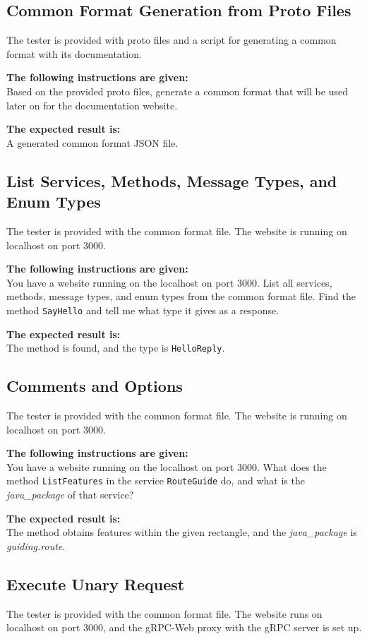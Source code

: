 \subsection{Common Format Generation from Proto Files}
The tester is provided with proto files and a script for generating a common format with its documentation.

\textbf{The following instructions are given:}\\
Based on the provided proto files, generate a common format that will be used later on for the documentation website.

\textbf{The expected result is:}\\
A generated common format JSON file.

\subsection{List Services, Methods, Message Types, and Enum Types}
The tester is provided with the common format file.
The website is running on localhost on port 3000.

\textbf{The following instructions are given:}\\
You have a website running on the localhost on port 3000.
List all services, methods, message types, and enum types from the common format file.
Find the method \texttt{SayHello} and tell me what type it gives as a response.

\textbf{The expected result is:}\\
The method is found, and the type is \texttt{HelloReply}.

\subsection{Comments and Options}
The tester is provided with the common format file.
The website is running on localhost on port 3000.

\textbf{The following instructions are given:}\\
You have a website running on the localhost on port 3000.
What does the method \texttt{ListFeatures} in the service \texttt{RouteGuide} do, and what is the \textit{java\_package} of that service?

\textbf{The expected result is:}\\
The method obtains features within the given rectangle, and the \textit{java\_package} is \textit{guiding.route}.

\subsection{Execute Unary Request}
The tester is provided with the common format file.
The website runs on localhost on port 3000, and the gRPC-Web proxy with the gRPC server is set up.

